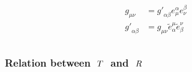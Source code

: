 \documentclass[letterpaper,10pt,english]{jupyterBook}
\begin{document}
\begin{equation*}
\begin{split}\begin{aligned}
 g_{\mu \nu} & = {g'}_{\alpha \beta} e_{\mu}^{\alpha} e_{\nu}^{\beta} \\
{g'}_{\alpha \beta} & = g_{\mu \nu} \widetilde{e}_{\alpha}^{\mu} \widetilde{e}_{\beta}^{\nu} \\
\end{aligned}\end{split}
\end{equation*}\subsubsection*{Relation between \protect\(\ T \ \protect\) and \protect\(\ R \ \protect\)}
\end{document}
